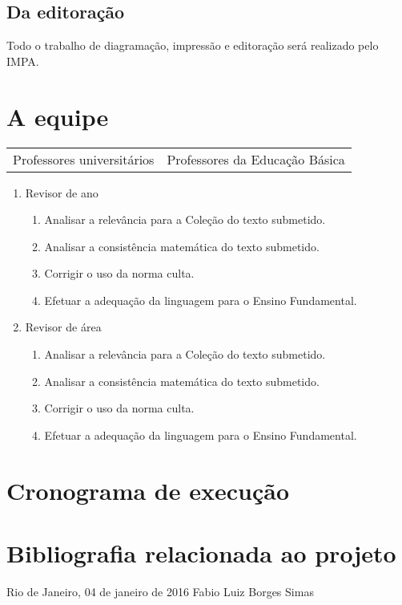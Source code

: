\documentclass[10 pt]{article}
\begin{document}
\subsection{Da editoração}
Todo o trabalho de diagramação, impressão e editoração será realizado pelo IMPA.

\section{A equipe}\label{equipe}
\begin{table}[ht]
  \begin{center}
    \begin{tabular}{ll}
      Professores universitários & Professores da Educação Básica  \\

    \end{tabular}
  \end{center}
\end{table}





\begin{enumerate}%
\item Revisor de ano
  \begin{enumerate}%
  \item Analisar a relevância para a Coleção do texto submetido.
  \item Analisar a consistência matemática do texto submetido.
  \item Corrigir o uso da norma culta.
  \item Efetuar a adequação da linguagem para o Ensino Fundamental.
  \end{enumerate}

\item Revisor de área
  \begin{enumerate}%
  \item Analisar a relevância para a Coleção do texto submetido.
  \item Analisar a consistência matemática do texto submetido.
  \item Corrigir o uso da norma culta.
  \item Efetuar a adequação da linguagem para o Ensino Fundamental.
  \end{enumerate}

\end{enumerate}

\section{Cronograma de execução}


\section{Bibliografia relacionada ao projeto}


\begin{center}
  Rio de Janeiro, 04 de janeiro de 2016 \hspace{2cm} Fabio Luiz Borges Simas
\end{center}



% 
\end{document}
